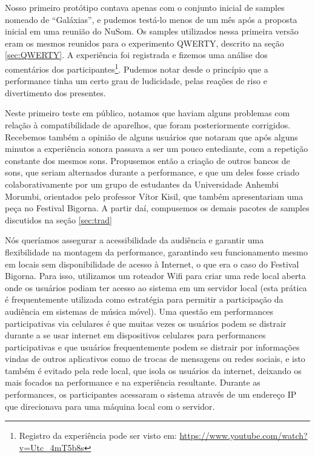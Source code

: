Nosso primeiro protótipo contava apenas com o conjunto inicial de samples nomeado de ``Galáxias'', e pudemos testá-lo menos de um mês após a proposta inicial em uma reunião do NuSom. Os samples utilizados nessa primeira versão eram os mesmos reunidos para o experimento QWERTY, descrito na seção \ref{sec:QWERTY}. A experiência foi registrada e fizemos uma análise dos comentários dos participantes\footnote{Registro da experiência pode ser visto em: \url{https://www.youtube.com/watch?v=Utc_4mT5b8s}}. Pudemos notar desde o princípio que a performance tinha um certo grau de ludicidade, pelas reações de riso e divertimento dos presentes. 


Neste primeiro teste em público, notamos que haviam alguns problemas com relação à compatibilidade de aparelhos, que foram posteriormente corrigidos. Recebemos também a opinião de alguns usuários que notaram que após alguns minutos a experiência sonora passava a ser um pouco entediante, com a repetição constante dos mesmos sons. Propusemos então a criação de outros bancos de sons, que seriam alternados durante a performance, e que um deles fosse criado colaborativamente por um grupo de estudantes da Universidade Anhembi Morumbi, orientados pelo professor Vítor Kisil,  que também apresentariam uma peça no Festival Bigorna. A partir daí, compusemos os demais pacotes de samples discutidos na seção \ref{sec:trad}

Nós queríamos assegurar a acessibilidade da audiência e garantir uma flexibilidade na montagem da performance, garantindo seu funcionamento mesmo em locais sem disponibilidade de acesso à Internet, o que era o caso do Festival Bigorna. Para isso, utilizamos um roteador Wifi para criar uma rede local aberta onde os usuários podiam ter acesso ao sistema em um servidor local (esta prática é frequentemente utilizada como estratégia para permitir a participação da audiência em sistemas de música móvel\cite{Lambert:2016}). Uma questão em performances participativas via celulares é que muitas vezes os usuários podem se distrair durante a se usar internet em dispositivos celulares para performances participativas e que usuários frequentemente podem se distrair por informações vindas de outros aplicativos como de trocas de mensagens ou redes sociais\cite{wu2017open}, e isto também é evitado pela rede local, que isola os usuários da internet, deixando os mais focados na performance e na experiência resultante. Durante as performances, os participantes acessaram o sistema através de um endereço IP que direcionava para uma máquina local com o servidor.

